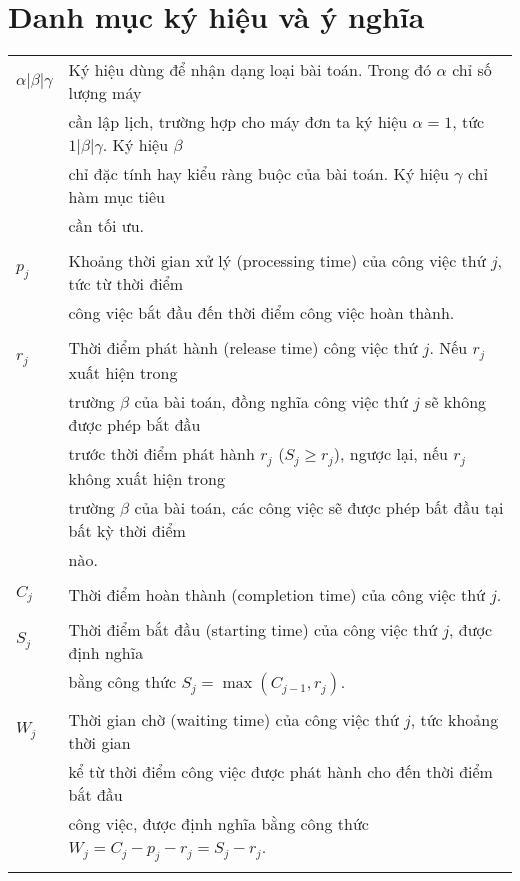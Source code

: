 \documentclass[12pt,a4paper]{report}
\begin{document}
	\chapter*{Danh mục ký hiệu và ý nghĩa}
	\thispagestyle{fancy}
	\begin{longtable}{l l}
		$\alpha | \beta | \gamma$ & Ký hiệu dùng để nhận dạng loại bài toán. Trong đó $\alpha$ chỉ số lượng máy \\
		& cần lập lịch, trường hợp cho máy đơn ta ký hiệu $\alpha = 1$, tức $1| \beta | \gamma$. Ký hiệu $\beta$ \\
		& chỉ đặc tính hay kiểu ràng buộc của bài toán. Ký hiệu $\gamma$ chỉ hàm mục tiêu \\
		& cần tối ưu. \\
		\\
		$p_j$ & Khoảng thời gian xử lý (processing time) của công việc thứ $j$, tức từ thời điểm \\
		& công việc bắt đầu đến thời điểm công việc hoàn thành. \\
		\\
		$r_j$ & Thời điểm phát hành (release time) công việc thứ $j$. Nếu $r_j$ xuất hiện trong \\
		& trường $\beta$ của bài toán, đồng nghĩa công việc thứ $j$ sẽ không được phép bắt đầu \\
		& trước thời điểm phát hành $r_j$ ($S_j \geq r_j$), ngược lại, nếu $r_j$ không xuất hiện trong \\
		& trường $\beta$ của bài toán, các công việc sẽ được phép bất đầu tại bất kỳ thời điểm \\
		& nào. \\
		\\
		$C_j$ & Thời điểm hoàn thành (completion time) của công việc thứ $j$. \\
		\\
		$S_j$ & Thời điểm bắt đầu (starting time) của công việc thứ $j$, được định nghĩa \\
		& bằng công thức $S_j = \max (C_{j-1}, r_j)$. \\
		\\
		$W_j$ & Thời gian chờ (waiting time) của công việc thứ $j$, tức khoảng thời gian \\
		& kể từ thời điểm công việc được phát hành cho đến thời điểm bắt đầu \\
		& công việc, được định nghĩa bằng công thức $W_j = C_j - p_j - r_j = S_j - r_j$. \\
		\\

\end{longtable}
\end{document}
